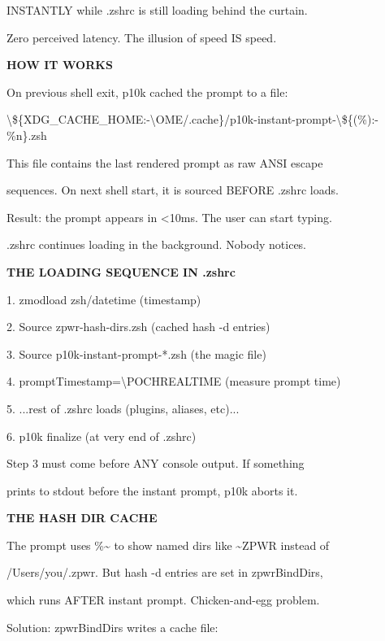 \documentclass[11pt,a4paper,twoside]{book}
\begin{document}
INSTANTLY while .zshrc is still loading behind the curtain.

Zero perceived latency. The illusion of speed IS speed.


\vspace{12pt}
{\bfseries\color{neonyellow} HOW IT WORKS}\vspace{4pt}

On previous shell exit, p10k cached the prompt to a file:

\textbackslash{}\$\{XDG\_CACHE\_HOME:-\textbackslash{}OME/.cache\}/p10k-instant-prompt-\textbackslash{}\$\{(\%):-\%n\}.zsh

This file contains the last rendered prompt as raw ANSI escape

sequences. On next shell start, it is sourced BEFORE .zshrc loads.

Result: the prompt appears in <10ms. The user can start typing.

.zshrc continues loading in the background. Nobody notices.


\vspace{12pt}
{\bfseries\color{neonyellow} THE LOADING SEQUENCE IN .zshrc}\vspace{4pt}

1. zmodload zsh/datetime (timestamp)

2. Source zpwr-hash-dirs.zsh (cached hash -d entries)

3. Source p10k-instant-prompt-*.zsh (the magic file)

4. promptTimestamp=\textbackslash{}POCHREALTIME (measure prompt time)

5. ...rest of .zshrc loads (plugins, aliases, etc)...

6. p10k finalize (at very end of .zshrc)

Step 3 must come before ANY console output. If something

prints to stdout before the instant prompt, p10k aborts it.


\vspace{12pt}
{\bfseries\color{neonyellow} THE HASH DIR CACHE}\vspace{4pt}

The prompt uses \%\textasciitilde{} to show named dirs like \textasciitilde{}ZPWR instead of

/Users/you/.zpwr. But hash -d entries are set in zpwrBindDirs,

which runs AFTER instant prompt. Chicken-and-egg problem.

Solution: zpwrBindDirs writes a cache file:
\end{document}
